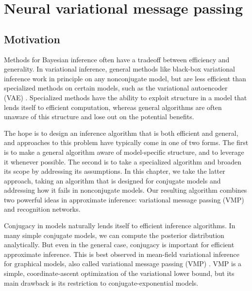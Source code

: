 \chapter{Neural variational message passing}

\section{Motivation}
Methods for Bayesian inference
often have a tradeoff between
efficiency and generality.
In variational inference,
general methods like black-box variational inference \cite{bbvi}
work in principle on any nonconjugate model,
but are less efficient
than specialized methods on certain models,
such as the variational autoencoder (VAE) \cite{vae}. 
Specialized
methods have the ability to
exploit structure in a model
that lends itself to efficient computation,
whereas general algorithms are often
unaware of this structure and lose out on the potential 
benefits.

The hope is to design an inference algorithm
that is both efficient and general,
and approaches to this problem have typically come in one of two forms.
The first is to make a general algorithm
aware of model-specific structure,
and to leverage it whenever possible.
The second is to take a specialized
algorithm and broaden its scope
by addressing its assumptions.
In this chapter, we take the latter approach,
taking an algorithm
that is designed for conjugate models
and addressing how it fails in nonconjugate models.
Our resulting algorithm combines two powerful ideas 
in approximate inference: variational message
passing (VMP)\cite{vmp} and recognition networks.


Conjugacy in models naturally lends itself
to efficient inference algorithms.
In many simple conjugate models,
we can compute the posterior distribution analytically.
But even in the general case, conjugacy is important
for efficient approximate inference.
This is best observed in mean-field variational inference
for graphical models, also called variational message passing (VMP) \cite{vmp}.
VMP is a simple, coordinate-ascent optimization of the
variational lower bound,
but its main drawback is its restriction
to conjugate-exponential models.

